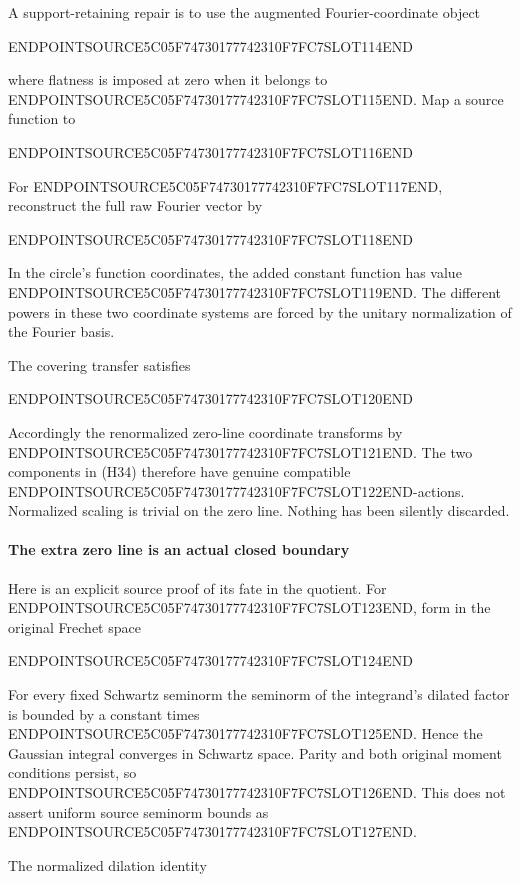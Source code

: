 A support-retaining repair is to use the augmented Fourier-coordinate object

ENDPOINTSOURCE5C05F74730177742310F7FC7SLOT114END

where flatness is imposed at zero when it belongs to ENDPOINTSOURCE5C05F74730177742310F7FC7SLOT115END. Map a source function to

ENDPOINTSOURCE5C05F74730177742310F7FC7SLOT116END

For ENDPOINTSOURCE5C05F74730177742310F7FC7SLOT117END, reconstruct the full raw Fourier vector by

ENDPOINTSOURCE5C05F74730177742310F7FC7SLOT118END

In the circle's function coordinates, the added constant function has value ENDPOINTSOURCE5C05F74730177742310F7FC7SLOT119END. The different powers in these two coordinate systems are forced by the unitary normalization of the Fourier basis.

The covering transfer satisfies

ENDPOINTSOURCE5C05F74730177742310F7FC7SLOT120END

Accordingly the renormalized zero-line coordinate transforms by ENDPOINTSOURCE5C05F74730177742310F7FC7SLOT121END. The two components in (H34) therefore have genuine compatible ENDPOINTSOURCE5C05F74730177742310F7FC7SLOT122END-actions. Normalized scaling is trivial on the zero line. Nothing has been silently discarded.

\paragraph{The extra zero line is an actual closed boundary}\label{endpoint-cc_hochschild--the-extra-zero-line-is-an-actual-closed-boundary}

Here is an explicit source proof of its fate in the quotient. For ENDPOINTSOURCE5C05F74730177742310F7FC7SLOT123END, form in the original Frechet space

ENDPOINTSOURCE5C05F74730177742310F7FC7SLOT124END

For every fixed Schwartz seminorm the seminorm of the integrand's dilated factor is bounded by a constant times ENDPOINTSOURCE5C05F74730177742310F7FC7SLOT125END. Hence the Gaussian integral converges in Schwartz space. Parity and both original moment conditions persist, so ENDPOINTSOURCE5C05F74730177742310F7FC7SLOT126END. This does not assert uniform source seminorm bounds as ENDPOINTSOURCE5C05F74730177742310F7FC7SLOT127END.

The normalized dilation identity

